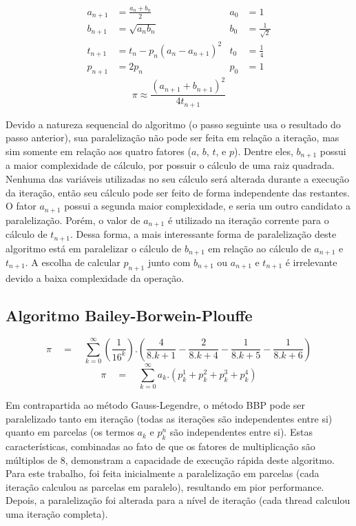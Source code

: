 \documentclass[12pt]{article}
\begin{document}
\begin{equation}
	\begin{aligned}
		a_{n+1} &= \frac{a_n + b_n}{2}			& a_0 &= 1\\
		b_{n+1} &= \sqrt{a_n b_n}				& b_0 &= \frac{1}{\sqrt{2}} \\
		t_{n+1} &= t_n - p_n(a_{n}-a_{n+1})^2	& t_0 &= \frac{1}{4} \\
		p_{n+1} &= 2p_n							& p_0 &= 1		
	\end{aligned}
\end{equation}
\begin{equation}
	\pi \approx \frac{(a_{n+1}+b_{n+1})^2}{4t_{n+1}}
\end{equation}

Devido a natureza sequencial do algoritmo (o passo seguinte usa o resultado do passo anterior),
sua paralelização não pode ser feita em relação a iteração, mas sim somente em relação aos quatro
fatores ($a$, $b$, $t$, e $p$). Dentre eles, $b_{n+1}$ possui a maior complexidade de cálculo,
por possuir o cálculo de uma raiz quadrada. Nenhuma das variáveis utilizadas no seu cálculo
será alterada durante a execução da iteração, então seu cálculo pode ser feito de forma
independente das restantes. O fator $a_{n+1}$ possui a segunda maior complexidade, e seria um
outro candidato a paralelização. Porém, o valor de $a_{n+1}$ é utilizado na iteração corrente
para o cálculo de $t_{n+1}$. Dessa forma, a mais interessante forma de paralelização deste
algoritmo está em paralelizar o cálculo de $b_{n+1}$ em relação ao cálculo de
$a_{n+1}$ e $t_{n+1}$. A escolha de calcular $p_{n+1}$ junto com $b_{n+1}$ ou
$a_{n+1}$ e $t_{n+1}$ é irrelevante devido a baixa complexidade da operação.\\

\subsection{Algoritmo Bailey-Borwein-Plouffe}

\begin{equation}
	\pi \quad = \quad \sum_{k=0}^{\infty}\left(\frac{1}{16^k}\right).
	\left(
		\frac{4}{8.k + 1} - \frac{2}{8.k + 4} - \frac{1}{8.k + 5} - \frac{1}{8.k + 6}
	\right)
\end{equation}
\begin{equation}
	\pi \quad = \quad \sum_{k=0}^{\infty} a_k.
	\left(p^1_k + p^2_k + p^3_k + p^4_k\right)
\end{equation}

Em contrapartida ao método Gauss-Legendre, o método BBP pode ser paralelizado tanto em iteração
(todas as iterações são independentes entre si) quanto em parcelas (os termos $a_k$ e $p^n_k$
são independentes entre si). Estas características, combinadas ao fato de que os fatores de
multiplicação são múltiplos de 8, demonstram a capacidade de execução rápida deste algoritmo.
Para este trabalho, foi feita inicialmente a paralelização em parcelas (cada iteração calculou
as parcelas em paralelo), resultando em pior performance. Depois, a paralelização foi 
alterada para a nível de iteração (cada thread calculou uma iteração completa).\\
\end{document}
